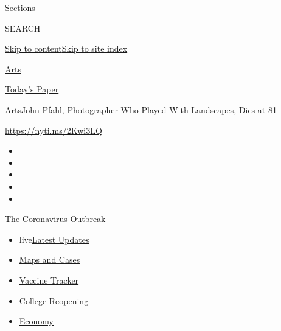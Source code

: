 Sections

SEARCH

\protect\hyperlink{site-content}{Skip to
content}\protect\hyperlink{site-index}{Skip to site index}

\href{https://www.nytimes.com/section/arts}{Arts}

\href{https://myaccount.nytimes.com/auth/login?response_type=cookie\&client_id=vi}{}

\href{https://www.nytimes.com/section/todayspaper}{Today's Paper}

\href{/section/arts}{Arts}\textbar{}John Pfahl, Photographer Who Played
With Landscapes, Dies at 81

\url{https://nyti.ms/2Kwi3LQ}

\begin{itemize}
\item
\item
\item
\item
\item
\end{itemize}

\href{https://www.nytimes.com/news-event/coronavirus?action=click\&pgtype=Article\&state=default\&region=TOP_BANNER\&context=storylines_menu}{The
Coronavirus Outbreak}

\begin{itemize}
\tightlist
\item
  live\href{https://www.nytimes.com/2020/08/03/world/coronavirus-covid-19.html?action=click\&pgtype=Article\&state=default\&region=TOP_BANNER\&context=storylines_menu}{Latest
  Updates}
\item
  \href{https://www.nytimes.com/interactive/2020/us/coronavirus-us-cases.html?action=click\&pgtype=Article\&state=default\&region=TOP_BANNER\&context=storylines_menu}{Maps
  and Cases}
\item
  \href{https://www.nytimes.com/interactive/2020/science/coronavirus-vaccine-tracker.html?action=click\&pgtype=Article\&state=default\&region=TOP_BANNER\&context=storylines_menu}{Vaccine
  Tracker}
\item
  \href{https://www.nytimes.com/2020/08/02/us/covid-college-reopening.html?action=click\&pgtype=Article\&state=default\&region=TOP_BANNER\&context=storylines_menu}{College
  Reopening}
\item
  \href{https://www.nytimes.com/live/2020/08/03/business/stock-market-today-coronavirus?action=click\&pgtype=Article\&state=default\&region=TOP_BANNER\&context=storylines_menu}{Economy}
\end{itemize}

